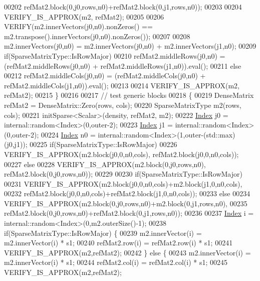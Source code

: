 \begin{DoxyCode}
00202                       refMat2.block(0,j0,rows,n0)+refMat2.block(0,j1,rows,n0));
00203     
00204     VERIFY\_IS\_APPROX(m2, refMat2);
00205     
00206     VERIFY(m2.innerVectors(j0,n0).nonZeros() == m2.transpose().innerVectors(j0,n0).nonZeros());
00207     
00208     m2.innerVectors(j0,n0) = m2.innerVectors(j0,n0) + m2.innerVectors(j1,n0);
00209     \textcolor{keywordflow}{if}(SparseMatrixType::IsRowMajor)
00210       refMat2.middleRows(j0,n0) = (refMat2.middleRows(j0,n0) + refMat2.middleRows(j1,n0)).eval();
00211     \textcolor{keywordflow}{else}
00212       refMat2.middleCols(j0,n0) = (refMat2.middleCols(j0,n0) + refMat2.middleCols(j1,n0)).eval();
00213     
00214     VERIFY\_IS\_APPROX(m2, refMat2);
00215   \}
00216 
00217   \textcolor{comment}{// test generic blocks}
00218   \{
00219     DenseMatrix refMat2 = DenseMatrix::Zero(rows, cols);
00220     SparseMatrixType m2(rows, cols);
00221     initSparse<Scalar>(density, refMat2, m2);
00222     \hyperlink{namespace_eigen_a62e77e0933482dafde8fe197d9a2cfde}{Index} j0 = internal::random<Index>(0,outer-2);
00223     \hyperlink{namespace_eigen_a62e77e0933482dafde8fe197d9a2cfde}{Index} j1 = internal::random<Index>(0,outer-2);
00224     \hyperlink{namespace_eigen_a62e77e0933482dafde8fe197d9a2cfde}{Index} n0 = internal::random<Index>(1,outer-(std::max)(j0,j1));
00225     \textcolor{keywordflow}{if}(SparseMatrixType::IsRowMajor)
00226       VERIFY\_IS\_APPROX(m2.block(j0,0,n0,cols), refMat2.block(j0,0,n0,cols));
00227     \textcolor{keywordflow}{else}
00228       VERIFY\_IS\_APPROX(m2.block(0,j0,rows,n0), refMat2.block(0,j0,rows,n0));
00229     
00230     \textcolor{keywordflow}{if}(SparseMatrixType::IsRowMajor)
00231       VERIFY\_IS\_APPROX(m2.block(j0,0,n0,cols)+m2.block(j1,0,n0,cols),
00232                       refMat2.block(j0,0,n0,cols)+refMat2.block(j1,0,n0,cols));
00233     \textcolor{keywordflow}{else}
00234       VERIFY\_IS\_APPROX(m2.block(0,j0,rows,n0)+m2.block(0,j1,rows,n0),
00235                       refMat2.block(0,j0,rows,n0)+refMat2.block(0,j1,rows,n0));
00236       
00237     \hyperlink{namespace_eigen_a62e77e0933482dafde8fe197d9a2cfde}{Index} i = internal::random<Index>(0,m2.outerSize()-1);
00238     \textcolor{keywordflow}{if}(SparseMatrixType::IsRowMajor) \{
00239       m2.innerVector(i) = m2.innerVector(i) * s1;
00240       refMat2.row(i) = refMat2.row(i) * s1;
00241       VERIFY\_IS\_APPROX(m2,refMat2);
00242     \} \textcolor{keywordflow}{else} \{
00243       m2.innerVector(i) = m2.innerVector(i) * s1;
00244       refMat2.col(i) = refMat2.col(i) * s1;
00245       VERIFY\_IS\_APPROX(m2,refMat2);

\end{DoxyCode}
